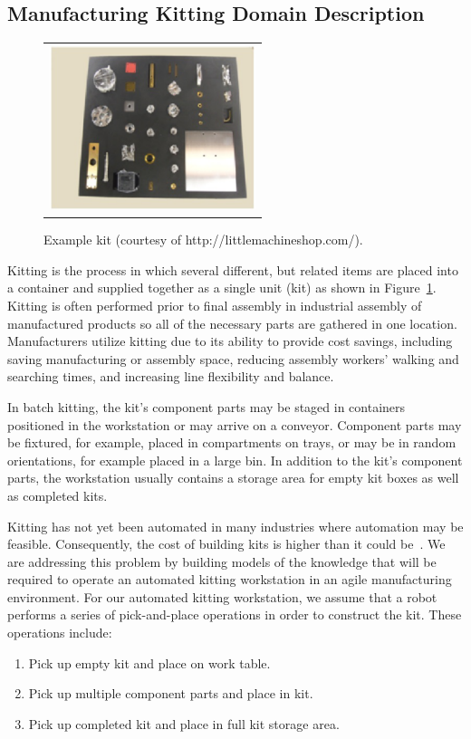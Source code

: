 \documentclass[preprint,12pt]{elsarticle}
\begin{document}
\subsection{Manufacturing Kitting Domain Description}
\begin{figure}[h!b!]
\begin{center}
\begin{tabular}{c}
\includegraphics[width=6cm]{kit.pdf}
\end{tabular}
\end{center}
\caption{Example kit (courtesy of http://littlemachineshop.com/).}
\label{fig:kit}
\end{figure}
Kitting is the process in which several different, but related items are placed into a container and supplied together as a single unit (kit) as shown in Figure~\ref{fig:kit}. Kitting is often performed prior to final assembly in industrial assembly of manufactured products so all of the necessary parts are gathered in one location. Manufacturers utilize kitting due to its ability to provide cost savings, 	including saving manufacturing or assembly space, reducing assembly workers' walking and searching times, and increasing line flexibility and balance.


In batch kitting, the kit's component parts may be staged in containers positioned in the workstation or may arrive on a conveyor. Component parts may be fixtured, for example, placed in compartments on trays, or may be in random orientations, for example placed in a large bin. In addition to the kit's component parts, the workstation usually contains a storage area for empty kit boxes as well as completed kits.


Kitting has not yet been automated in many industries where automation may be feasible. Consequently, the cost of building kits is higher than it could be~\cite{Balakirsky.IROS.2012}. We are addressing this problem by building models of the knowledge that will be required to operate an automated kitting workstation in an agile manufacturing environment. For our automated kitting workstation, we assume that a robot performs a series of pick-and-place operations in order to construct the kit. These operations include:
\begin{enumerate}
\item Pick up empty kit and place on work table.
\item Pick up multiple component parts and place in kit.
\item Pick up completed kit and place in full kit storage area.
\end{enumerate}
\end{document}
